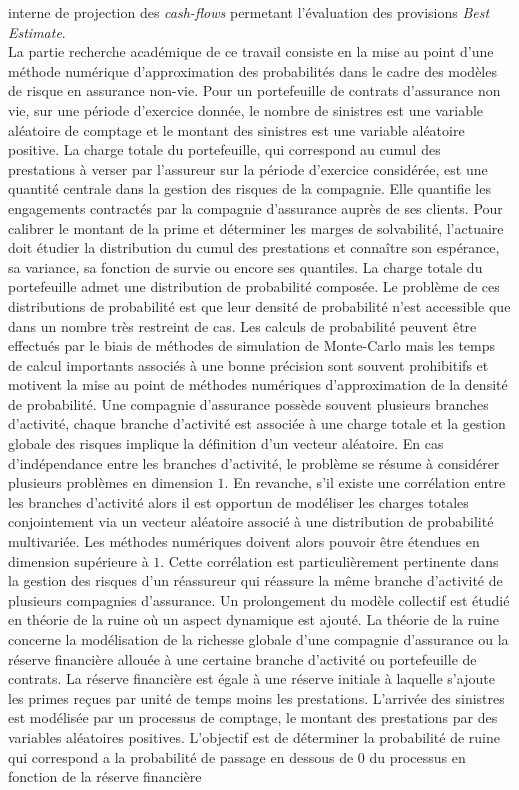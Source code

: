 interne de projection des \textit{cash-flows} permetant l'évaluation des provisions \textit{Best Estimate}.\\

La partie recherche académique de ce travail consiste en la mise au point d\rq{}une méthode numérique d\rq{}approximation des probabilités dans le cadre des modèles de risque en assurance non-vie. Pour un portefeuille de contrats d\rq{}assurance non vie, sur une période d\rq{}exercice donnée, le nombre de sinistres est une variable aléatoire de comptage et le montant des sinistres est une variable aléatoire positive. La charge totale du portefeuille, qui correspond au cumul des prestations à verser par l\rq{}assureur sur la période d\rq{}exercice considérée, est une quantité centrale dans la gestion des risques de la compagnie. Elle quantifie les engagements contractés par la compagnie d\rq{}assurance auprès de ses clients. Pour calibrer le montant de la prime et déterminer les marges de solvabilité, l\rq{}actuaire doit étudier la distribution du cumul des prestations et connaître son espérance, sa variance, sa fonction de survie ou encore ses quantiles. La charge totale du portefeuille admet une distribution de probabilité composée. Le problème de ces distributions de probabilité est que leur densité de probabilité n\rq{}est accessible que dans un nombre très restreint de cas. Les calculs de probabilité peuvent être effectués par le biais de méthodes de simulation de Monte-Carlo mais les temps de calcul importants associés à une bonne précision sont souvent prohibitifs et motivent la mise au point de méthodes numériques d\rq{}approximation de la densité de probabilité. Une compagnie d\rq{}assurance possède souvent plusieurs branches d\rq{}activité, chaque branche d\rq{}activité est associée à une charge totale et la gestion globale des risques implique la définition d\rq{}un vecteur aléatoire. En cas d\rq{}indépendance entre les branches d\rq{}activité, le problème se résume à considérer plusieurs problèmes en dimension $1$. En revanche, s\rq{}il existe une corrélation entre les branches d\rq{}activité alors il est opportun de modéliser les charges totales conjointement via un vecteur aléatoire associé à une distribution de probabilité multivariée. Les méthodes numériques doivent alors pouvoir être étendues en dimension supérieure à $1$. Cette corrélation est particulièrement pertinente dans la gestion des risques d\rq{}un réassureur qui réassure la même branche d\rq{}activité de plusieurs compagnies d\rq{}assurance. Un prolongement du modèle collectif est étudié en théorie de la ruine où un aspect dynamique est ajouté. La théorie de la ruine concerne la modélisation de la richesse globale d'une compagnie d'assurance ou la réserve financière allouée à une certaine branche d'activité ou portefeuille de contrats. La réserve financière est égale à une réserve initiale à laquelle s'ajoute les primes reçues par unité de temps moins les prestations. L'arrivée des sinistres est modélisée par un processus de comptage, le montant des prestations par des variables aléatoires positives. L'objectif est de déterminer la probabilité de ruine qui correspond a la probabilité de passage en dessous de $0$ du processus en fonction de la réserve financière 